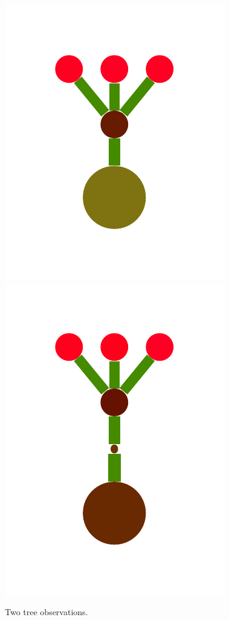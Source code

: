 \documentclass[a4paper,10pt]{article}
\begin{document}
\begin{figure}[t]
  \begin{minipage}{.7\textwidth}
    
  \end{minipage}    
  \begin{minipage}{.25\textwidth}
    \includegraphics[scale=.26]{./figures/2-2-two-trees-0.pdf}
    \includegraphics[scale=.26]{./figures/2-2-two-trees-1.pdf}
  \end{minipage}        
\caption{Two tree observations.}
\label{fig:tree-obs}
\end{figure}
\end{document}
